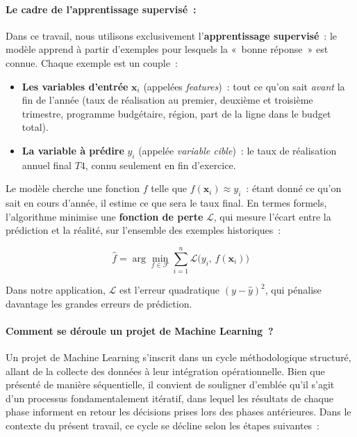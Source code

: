 \paragraph{Le cadre de l'apprentissage supervisé~:}

Dans ce travail, nous utilisons exclusivement l'\textbf{apprentissage supervisé}~: le
modèle apprend à partir d'exemples pour lesquels la «~bonne réponse~» est connue.
Chaque exemple est un couple~:

\begin{itemize}
    \item \textbf{Les variables d'entrée} $\mathbf{x}_i$ (appelées \textit{features})~:
    tout ce qu'on sait \textit{avant} la fin de l'année (taux de réalisation au premier,
    deuxième et troisième trimestre, programme budgétaire, région, part de la ligne dans
    le budget total).
    \item \textbf{La variable à prédire} $y_i$ (appelée \textit{variable cible})~: le
    taux de réalisation annuel final $T4$, connu seulement en fin d'exercice.
\end{itemize}

Le modèle cherche une fonction $f$ telle que $f(\mathbf{x}_i) \approx y_i$~: étant
donné ce qu'on sait en cours d'année, il estime ce que sera le taux final. En termes
formels, l'algorithme minimise une \textbf{fonction de perte} $\mathcal{L}$, qui
mesure l'écart entre la prédiction et la réalité, sur l'ensemble des exemples
historiques~:

$$\hat{f} = \arg\min_{f \in \mathcal{F}} \sum_{i=1}^{n}
\mathcal{L}\bigl(y_i,\, f(\mathbf{x}_i)\bigr)$$

Dans notre application, $\mathcal{L}$ est l'erreur quadratique $(y - \hat{y})^2$, qui
pénalise davantage les grandes erreurs de prédiction.

\paragraph{Comment se déroule un projet de Machine Learning~?}

Un projet de Machine Learning s'inscrit dans un cycle méthodologique structuré, allant
de la collecte des données à leur intégration opérationnelle. Bien que présenté de
manière séquentielle, il convient de souligner d'emblée qu'il s'agit d'un processus
fondamentalement itératif, dans lequel les résultats de chaque phase informent en retour
les décisions prises lors des phases antérieures. Dans le contexte du présent travail,
ce cycle se décline selon les étapes suivantes~:

